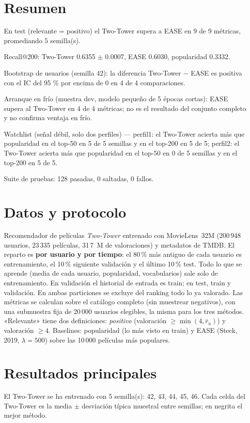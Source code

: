 \section{Resumen}
En test (relevante = positivo) el Two-Tower supera a EASE en 9 de 9 métricas, promediando 5 semilla(s).

Recall@200: Two-Tower 0.6355 $\pm$ 0.0007, EASE 0.6030, popularidad 0.3332.

Bootstrap de usuarios (semilla 42): la diferencia Two-Tower $-$ EASE es positiva con el IC del 95 \% por encima de 0 en 4 de 4 comparaciones.

Arranque en frío (muestra dev, modelo pequeño de 5 épocas cortas): EASE supera al Two-Tower en 4 de 4 métricas; no es el resultado del conjunto completo y no confirma ventaja en frío.

Watchlist (señal débil, solo dos perfiles) — perfil1: el Two-Tower acierta más que popularidad en el top-50 en 5 de 5 semillas y en el top-200 en 5 de 5; perfil2: el Two-Tower acierta más que popularidad en el top-50 en 0 de 5 semillas y en el top-200 en 5 de 5.

Suite de pruebas: 128 pasadas, 0 saltadas, 0 fallos.

\section{Datos y protocolo}
Recomendador de películas \emph{Two-Tower} entrenado con MovieLens~32M (200\,948 usuarios, 23\,335 películas, 31\,7~M de valoraciones) y
metadatos de TMDB. El reparto es \textbf{por usuario y por tiempo}: el 80\,\% más antiguo de cada usuario es entrenamiento, el 10\,\% siguiente validación y el último 10\,\% test.
Todo lo que se aprende (media de cada usuario, popularidad, vocabularios) sale solo de entrenamiento. En validación el historial de entrada es train; en test, train y validación.
En ambas particiones se excluye del ranking todo lo ya valorado. Las métricas se calculan sobre el catálogo completo (sin muestrear negativos), con una submuestra fija de
20\,000 usuarios elegibles, la misma para los tres métodos. «Relevante» tiene dos definiciones: \emph{positivo} (valoración $\geq \min(4, \bar r_u)$) y valoración $\geq 4$.
Baselines: popularidad (lo más visto en train) y EASE (Steck, 2019, $\lambda=500$) sobre las 10\,000 películas más populares.

\section{Resultados principales}
El Two-Tower se ha entrenado con 5 semilla(s): 42, 43, 44, 45, 46. Cada celda del Two-Tower es la media $\pm$ desviación típica muestral entre semillas; en negrita el mejor método.

